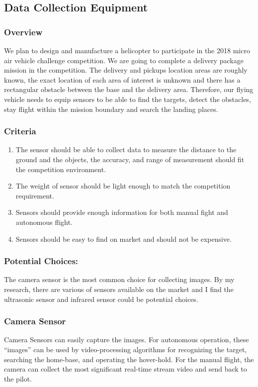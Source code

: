\documentclass[onecolumn, draftclsnofoot,10pt, compsoc]{IEEEtran}
\begin{document}
\subsection{Data Collection Equipment}
\subsubsection{Overview}
We plan to design and manufacture a helicopter to participate in the 2018 micro air vehicle challenge competition. We are going to complete a delivery package mission in the competition. The delivery and pickups location areas are roughly known, the exact location of each area of interest is unknown and there has a rectangular obstacle between the base and the delivery area. Therefore, our flying vehicle needs to equip sensors to be able to find the targets, detect the obstacles, stay flight within the mission boundary and search the landing places.

\subsubsection{Criteria}
\begin{enumerate}
\item{The sensor should be able to collect data to measure the distance to the ground and the objects, the accuracy, and range of measurement should fit the competition environment.}
\item{The weight of sensor should be light enough to match the competition requirement.}
\item{Sensors should provide enough information for both manual fight and autonomous flight.}
\item{Sensors should be easy to find on market and should not be expensive.}
\end{enumerate}

\subsubsection{Potential Choices:}
The camera sensor is the most common choice for collecting images. By my research, there are various of sensors available on the market and I find the ultrasonic sensor and infrared sensor could be potential choices.

\subsubsection{Camera Sensor}
Camera Sensors can easily capture the images. For autonomous operation, these “images” can be used by video-processing algorithms for recognizing the target, searching the home-base, and operating the hover-hold. For the manual flight, the camera can collect the most significant real-time stream video and send back to the pilot.
\end{document}
